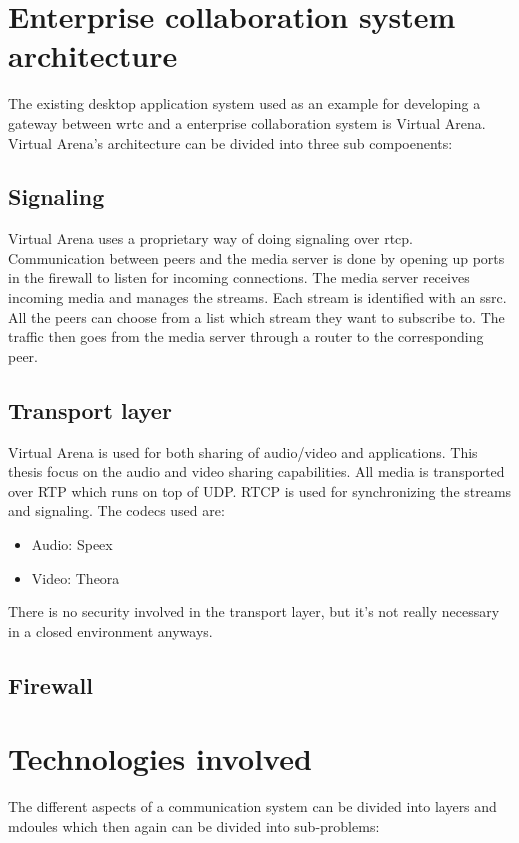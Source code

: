 \section{Enterprise collaboration system architecture}
The existing desktop application system used as an example for developing a gateway between \gls{wrtc} and a enterprise collaboration system is Virtual Arena. Virtual Arena's architecture can be divided into three sub compoenents:

\subsection{Signaling}
Virtual Arena uses a proprietary way of doing signaling over \gls{rtcp}. Communication between peers and the media server is done by opening up ports in the firewall to listen for incoming connections. The media server receives incoming media and manages the streams. Each stream is identified with an \gls{ssrc}. All the peers can choose from a list which stream they want to subscribe to. The traffic then goes from the media server through a router to the corresponding peer.

\subsection{Transport layer}
Virtual Arena is used for both sharing of audio/video and applications. This thesis focus on the audio and video sharing capabilities. All media is transported over RTP which runs on top of UDP. RTCP is used for synchronizing the streams and signaling. The codecs used are:
\begin{itemize}
\item{Audio: Speex}
\item{Video: Theora}
\end{itemize}
There is no security involved in the transport layer, but it's not really necessary in a closed environment anyways. 

\subsection{Firewall}

\section{Technologies involved}

The different aspects of a communication system can be divided into layers and mdoules which then again can be divided into sub-problems:

